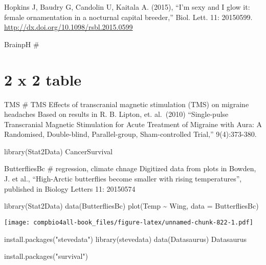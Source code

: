 \documentclass[
]{book}
\newenvironment{Shaded}{\begin{snugshade}}{\end{snugshade}}
\newcommand{\AttributeTok}[1]{\textcolor[rgb]{0.77,0.63,0.00}{#1}}
\newcommand{\FunctionTok}[1]{\textcolor[rgb]{0.00,0.00,0.00}{#1}}
\newcommand{\NormalTok}[1]{#1}
\newcommand{\SpecialCharTok}[1]{\textcolor[rgb]{0.00,0.00,0.00}{#1}}
\newcommand{\StringTok}[1]{\textcolor[rgb]{0.31,0.60,0.02}{#1}}
\begin{document}
Hopkins J, Baudry G, Candolin U, Kaitala A. (2015), ``I'm sexy and I glow it: female ornamentation in a nocturnal capital breeder,'' Biol. Lett. 11: 20150599.
\url{http://dx.doi.org/10.1098/rsbl.2015.0599}

BrainpH \#

\hypertarget{x-2-table}{%
\chapter{2 x 2 table}\label{x-2-table}}

TMS \# TMS Effects of transcranial magnetic stimulation (TMS) on migraine headaches
Based on results in R. B. Lipton, et. al.~(2010) ``Single-pulse Transcranial Magnetic Stimulation for Acute Treatment of Migraine with Aura: A Randomised, Double-blind, Parallel-group, Sham-controlled Trial,'' 9(4):373-380.

library(Stat2Data)
CancerSurvival

ButterfliesBc \# regression, climate chnage
Digitized data from plots in Bowden, J. et al., ``High-Arctic butterflies become smaller with rising temperatures'', published in Biology Letters 11: 20150574

\begin{Shaded}
\begin{Highlighting}[]
\FunctionTok{library}\NormalTok{(Stat2Data)}
\FunctionTok{data}\NormalTok{(ButterfliesBc)}
\FunctionTok{plot}\NormalTok{(Temp }\SpecialCharTok{\textasciitilde{}}\NormalTok{ Wing, }\AttributeTok{data =}\NormalTok{ ButterfliesBc)}
\end{Highlighting}
\end{Shaded}

\texttt{[image: compbio4all-book\_files/figure-latex/unnamed-chunk-822-1.pdf]}

\begin{Shaded}
\begin{Highlighting}[]
\FunctionTok{install.packages}\NormalTok{(}\StringTok{"stevedata"}\NormalTok{)}
\FunctionTok{library}\NormalTok{(stevedata)}
\FunctionTok{data}\NormalTok{(Datasaurus)}
\NormalTok{Datasaurus}
\end{Highlighting}
\end{Shaded}

\begin{Shaded}
\begin{Highlighting}[]
\FunctionTok{install.packages}\NormalTok{(}\StringTok{"survival"}\NormalTok{)}
\end{Highlighting}
\end{Shaded}
\end{document}
